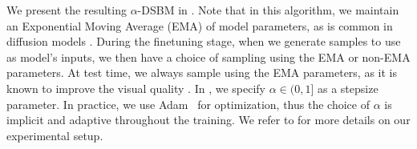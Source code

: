 \documentclass{article}
\begin{document}
We present the resulting $\alpha$-DSBM in .
Note that in this algorithm, we maintain an Exponential Moving Average (EMA) of model parameters, as is common in diffusion models \citep{nichol2021improved}. During the finetuning stage, when we generate samples to use as model's inputs, we then have a choice of sampling using the EMA or non-EMA parameters. At test time, we always sample using the EMA parameters, as it is known to improve the visual quality \citep{song_improved_2020}. In , we specify $\alpha \in (0,1]$ as a stepsize parameter. In practice, we use Adam~\citep{kingma:adam} for optimization, thus the choice of $\alpha$ is implicit and adaptive throughout the training. We refer to  for more details on our experimental setup. 
\end{document}
